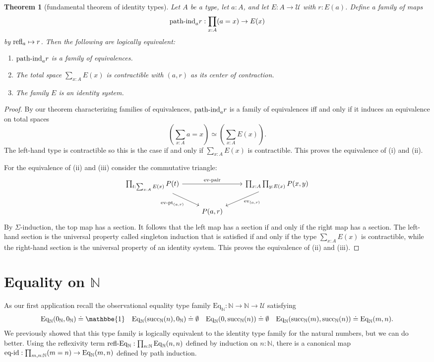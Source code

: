 \documentclass{amsart}
\theoremstyle{theorem}
\newtheorem*{thm}{Theorem}
\theoremstyle{definition}
\theoremstyle{remark}
\newcommand{\0}{\mathbbe{0}}
\newcommand{\1}{\mathbbe{1}}
\newcommand{\2}{\mathbbe{2}}
\newcommand{\3}{\mathbbe{3}}
\newcommand{\4}{\mathbbe{4}}
\newcommand{\term}[1]{{\textup{#1}}}
\newcommand{\bN}{{\mathbb{N}}}
\newcommand{\suc}{\term{succ}_{\bN}}
\newcommand{\refl}{\term{refl}}
\newcommand{\UU}{{\mathcal{U}}}
\newcommand{\Eq}{\mathrm{Eq}}
\newcommand{\ev}{\term{ev}}
\begin{document}
\begin{thm}[fundamental theorem of identity types] Let $A$ be a type, let $a :A$, and let $E : A \to \UU$ with $r : E(a)$. Define a family of maps  \[ \term{path-ind}_a r : \prod_{x:A}(a=x) \to E(x)\] by $\refl_a \mapsto r$. Then the following are logically equivalent:
\begin{enumerate}
\item $\term{path-ind}_ar$ is a family of equivalences.
\item The total space $\sum_{x:A}E(x)$ is contractible with $(a,r)$ as its center of contraction.
\item The family $E$ is an identity system.
\end{enumerate}
\end{thm}
\begin{proof}
By our theorem characterizing families of equivalences, $\term{path-ind}_ar$ is a family of equivalences iff and only if it induces an equivalence on total spaces
\[ \left(\sum_{x:A}a=x \right) \simeq \left(\sum_{x:A}E(x)\right).\]
The left-hand type is contractible so this is the case if and only if $\sum_{x:A}E(x)$ is contractible. This proves the equivalence of (i) and (ii).

For the equivalence of (ii) and (iii) consider the commutative triangle:
\[
\begin{tikzcd} \prod_{t : \sum_{x:A}E(x)} P(t) \arrow[rr, "\term{ev-pair}"] \arrow[dr, "\term{ev-pt}_{(a,r)}"'] & & \prod_{x:A} \prod_{y : E(x)} P(x,y) \arrow[dl, "\ev_{(a,r)}"] \\ & P(a,r)
\end{tikzcd}
\]
By $\Sigma$-induction, the top map has a section. It follows that the left map has a section if and only if the right map has a section. The left-hand section is the universal property called singleton induction that is satisfied if and only if the type $\sum_{x:A}E(x)$ is contractible, while the right-hand section is the universal property of an identity system. This proves the equivalence of  (ii) and (iii).
\end{proof}

\section*{Equality on \texorpdfstring{$\bN$}{N}}

As our first application recall the observational equality type family $\Eq_\bN : \bN \to \bN \to \UU$ satisfying
\[ \Eq_\bN(0_\bN,0_\bN) \doteq \1 \quad \Eq_\bN(\suc(n),0_\bN) \doteq \emptyset \quad \Eq_\bN(0,\suc(n)) \doteq \emptyset \quad \Eq_\bN(\suc(m), \suc(n)) \doteq \Eq_\bN(m,n).\] We previously showed that this type family is logically equivalent to the identity type family for the natural numbers, but we can do better. Using the reflexivity term $\term{refl-Eq}_\bN : \prod_{n :\bN} \Eq_{\bN}(n,n)$ defined by induction on $n : \bN$, there is a canonical map $\term{eq-id} : \prod_{m, n : \bN} (m=n) \to \Eq_\bN(m,n)$ defined by path induction.
\end{document}
